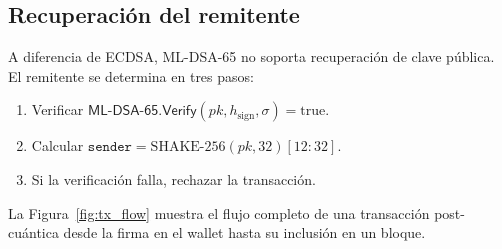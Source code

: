 \subsection{Recuperación del remitente}

A diferencia de ECDSA, ML-DSA-65 no soporta recuperación de clave pública. El remitente se determina en tres pasos:
\begin{enumerate}
  \item Verificar $\textsf{ML-DSA-65.Verify}(\mathit{pk}, h_{\text{sign}}, \sigma) = \text{true}$.
  \item Calcular $\texttt{sender} = \text{SHAKE-256}(\mathit{pk}, 32)[12{:}32]$.
  \item Si la verificación falla, rechazar la transacción.
\end{enumerate}

La Figura~\ref{fig:tx_flow} muestra el flujo completo de una transacción post-cuántica desde la firma en el wallet hasta su inclusión en un bloque.

